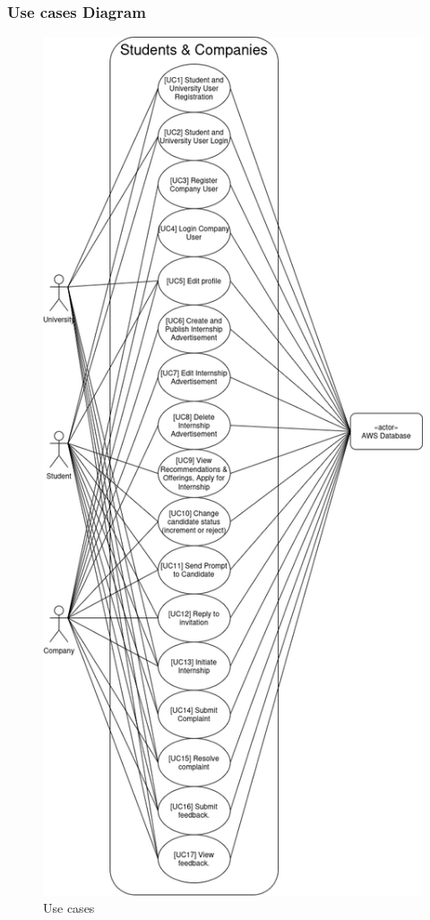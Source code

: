 \subsubsection{Use cases Diagram}
\begin{figure}[H]
    \centering
    \includegraphics[height=0.9\textheight]{Diagram 4.png}
    \caption{Use cases}
    \label{fig:enter-label}
\end{figure}

